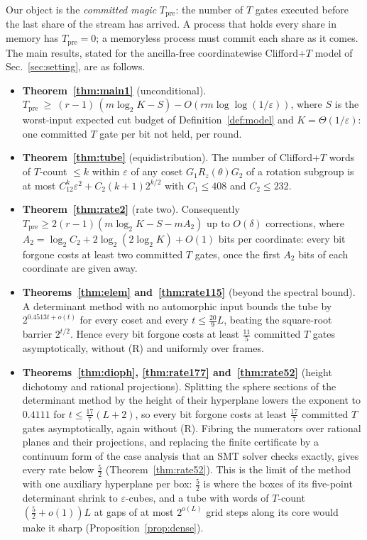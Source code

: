 \documentclass[aps,prx,twocolumn,superscriptaddress,nofootinbib,longbibliography]{revtex4-2}
\theoremstyle{plain}
\theoremstyle{definition}
\theoremstyle{remark}
\newcommand{\Tpre}{T_{\mathrm{pre}}}
\begin{document}
Our object is the \emph{committed magic} $\Tpre$: the number of $T$ gates executed before the last share of the stream has arrived. A process that holds every share in memory has $\Tpre=0$; a memoryless process must commit each share as it comes. The main results, stated for the ancilla-free coordinatewise Clifford+$T$ model of Sec.~\ref{sec:setting}, are as follows.
\begin{itemize}\setlength\itemsep{1pt}
\item \textbf{Theorem~\ref{thm:main1}} (unconditional). $\Tpre\ \ge\ (r-1)\,(m\log_2K-S)-O(rm\log\log(1/\varepsilon))$, where $S$ is the worst-input expected cut budget of Definition~\ref{def:model} and $K=\Theta(1/\varepsilon)$: one committed $T$ gate per bit not held, per round.
\item \textbf{Theorem~\ref{thm:tube}} (equidistribution). The number of Clifford+$T$ words of $T$-count $\le k$ within $\varepsilon$ of any coset $G_1R_z(\theta)G_2$ of a rotation subgroup is at most $C_12^k\varepsilon^2+C_2(k+1)2^{k/2}$ with $C_1\le408$ and $C_2\le232$.
\item \textbf{Theorem~\ref{thm:rate2}} (rate two). Consequently $\Tpre\ge2(r-1)(m\log_2K-S-mA_2)$ up to $O(\delta)$ corrections, where $A_2=\log_2C_2+2\log_2(2\log_2K)+O(1)$ bits per coordinate: every bit forgone costs at least two committed $T$ gates, once the first $A_2$ bits of each coordinate are given away.
\item \textbf{Theorems~\ref{thm:elem} and~\ref{thm:rate115}} (beyond the spectral bound). A determinant method with no automorphic input bounds the tube by $2^{0.4513t+o(t)}$ for every coset and every $t\le\tfrac{20}9L$, beating the square-root barrier $2^{t/2}$. Hence every bit forgone costs at least $\tfrac{11}5$ committed $T$ gates asymptotically, without (R) and uniformly over frames.
\item \textbf{Theorems~\ref{thm:dioph}, \ref{thm:rate177} and~\ref{thm:rate52}} (height dichotomy and rational projections). Splitting the sphere sections of the determinant method by the height of their hyperplane lowers the exponent to $0.4111$ for $t\le\tfrac{17}7(L+2)$, so every bit forgone costs at least $\tfrac{17}7$ committed $T$ gates asymptotically, again without (R). Fibring the numerators over rational planes and their projections, and replacing the finite certificate by a continuum form of the case analysis that an SMT solver checks exactly, gives every rate below $\tfrac52$ (Theorem~\ref{thm:rate52}). This is the limit of the method with one auxiliary hyperplane per box: $\tfrac52$ is where the boxes of its five-point determinant shrink to $\varepsilon$-cubes, and a tube with words of $T$-count $(\tfrac52+o(1))L$ at gaps of at most $2^{o(L)}$ grid steps along its core would make it sharp (Proposition~\ref{prop:dense}).

\end{itemize}
\end{document}
